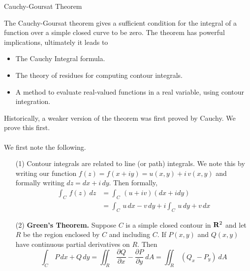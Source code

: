 \vspace*{1em}

\begin{mdframed}
\begin{center}
{\Large Cauchy-Goursat Theorem}
\end{center}
\end{mdframed}

\begin{discussion}
The Cauchy-Goursat theorem gives a sufficient condition for the integral of a function over a simple closed curve to be zero. The theorem has powerful implications, ultimately it leads to
\begin{itemize}
\item The Cauchy Integral formula.
\item The theory of residues for computing contour integrals.
\item A method to evaluate real-valued functions in a real variable, using contour integration.
\end{itemize}
Historically, a weaker version of the theorem was first proved by Cauchy. We prove this first.\\
\\
We first note the following.
\begin{itemize}
\item[(1)] Contour integrals are related to line (or path) integrals. We note this by writing our function $f(z) = f(x + iy) = u(x,y) + i\,v(x,y)$ and formally writing $dz = dx + i\,dy$. Then formally,
\begin{align*}
\int_C\,f(z)\ dz &= \int_C\, (u + iv)(dx + idy)\\[1em]
&= \int_C\, u\,dx - v\,dy + i\int_C\,u\,dy + v\,dx
\end{align*}

\item[(2)] \textbf{Green's Theorem.} Suppose $C$ is a simple closed contour in $\mathbf R^2$ and let $R$ be the region enclosed by $C$ and including $C$. If $P(x,y)$ and $Q(x,y)$ have continuous partial derivatives on $R$. Then
\[\int_C\,P\,dx + Q\,dy = \iint_R\,\frac{\partial Q}{\partial x} - \frac{\partial P}{\partial y}\ dA = \iint_R\,(Q_x - P_y)\ dA\]
\end{itemize}
\end{discussion}

\vspace*{1em}

